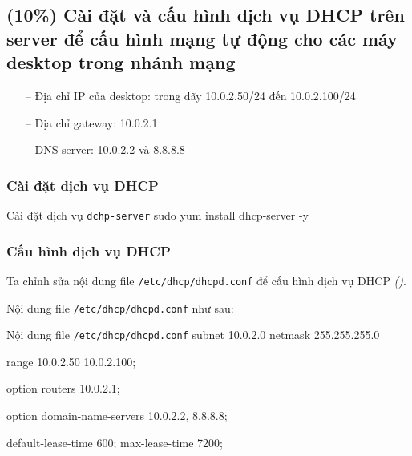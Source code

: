 \subsection{(10\%) Cài đặt và cấu hình dịch vụ DHCP trên server để cấu hình mạng tự động
  cho các máy desktop trong nhánh mạng}

\begin{itemize}
  \item[--] Địa chỉ IP của desktop: trong dãy 10.0.2.50/24 đến 10.0.2.100/24
  \item[--] Địa chỉ gateway:  10.0.2.1
  \item[--] DNS server: 10.0.2.2 và 8.8.8.8
\end{itemize}

\subsubsection{Cài đặt dịch vụ DHCP}

\vspace{0.5cm}
\begin{coding}{Cài đặt dịch vụ \texttt{dchp-server}}
  sudo yum install dhcp-server -y
\end{coding}

\subsubsection{Cấu hình dịch vụ DHCP}

Ta chỉnh sửa nội dung file \texttt{/etc/dhcp/dhcpd.conf} để cấu hình dịch vụ DHCP
\textit{()}.


Nội dung file \texttt{/etc/dhcp/dhcpd.conf} như sau:

\vspace{0.5cm}
\begin{coding}{Nội dung file \texttt{/etc/dhcp/dhcpd.conf}}
  subnet 10.0.2.0 netmask 255.255.255.0 {
      range 10.0.2.50 10.0.2.100;

      option routers 10.0.2.1;

      option domain-name-servers 10.0.2.2, 8.8.8.8;

      default-lease-time 600;
      max-lease-time 7200;
    }
\end{coding}

